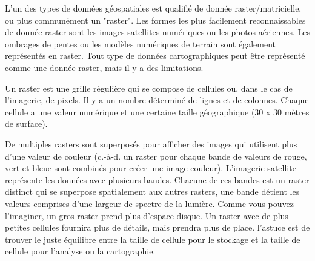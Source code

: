 L'un des types de données géospatiales est qualifié de donnée raster/matricielle, ou plus communément un "raster". Les formes les plus facilement reconnaissables de donnée raster sont les images satellites numériques ou les photos aériennes. Les ombrages de pentes ou les modèles numériques de terrain sont également représentés en raster. Tout type de données cartographiques peut être représenté comme une donnée raster, mais il y a des limitations.

Un raster est une grille régulière qui se compose de cellules ou, dans le cas de l'imagerie, de pixels. Il y a un nombre déterminé de lignes et de colonnes. Chaque cellule a une valeur numérique et une certaine taille géographique (30 x 30 mètres de surface).

De multiples rasters sont superposés pour afficher des images qui utilisent plus d'une valeur de couleur (c.-à-d. un raster pour chaque bande de valeurs de rouge, vert et bleue sont combinés pour créer une image couleur). L'imagerie satellite représente les données avec plusieurs bandes. Chacune de ces bandes est un raster distinct qui se superpose spatialement aux autres rasters, une bande détient les valeurs comprises d'une largeur de spectre de la lumière. Comme vous pouvez l'imaginer, un gros raster prend plus d'espace-disque. Un raster avec de plus petites cellules fournira plus de détails, mais prendra plus de place. l'astuce est de trouver le juste équilibre entre la taille de cellule pour le stockage et la taille de cellule pour l'analyse ou la cartographie.

%
%
%
%

